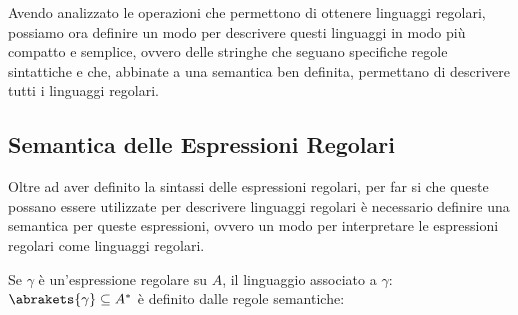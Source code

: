 Avendo analizzato le operazioni che permettono di ottenere linguaggi regolari, possiamo ora definire un modo per descrivere questi linguaggi in modo più compatto e semplice, ovvero delle stringhe che seguano specifiche regole sintattiche e che, abbinate a una semantica ben definita, permettano di descrivere tutti i linguaggi regolari.

\subsection{Semantica delle Espressioni Regolari}

Oltre ad aver definito la sintassi delle espressioni regolari, per far si che queste possano essere utilizzate per descrivere linguaggi regolari è necessario definire una semantica per queste espressioni, ovvero un modo per interpretare le espressioni regolari come linguaggi regolari.

Se \(\gamma\) è un'espressione regolare su \(A\), il linguaggio associato a \(\gamma\): \(\abrakets{\gamma} \subseteq A^*\) è definito dalle regole semantiche:

